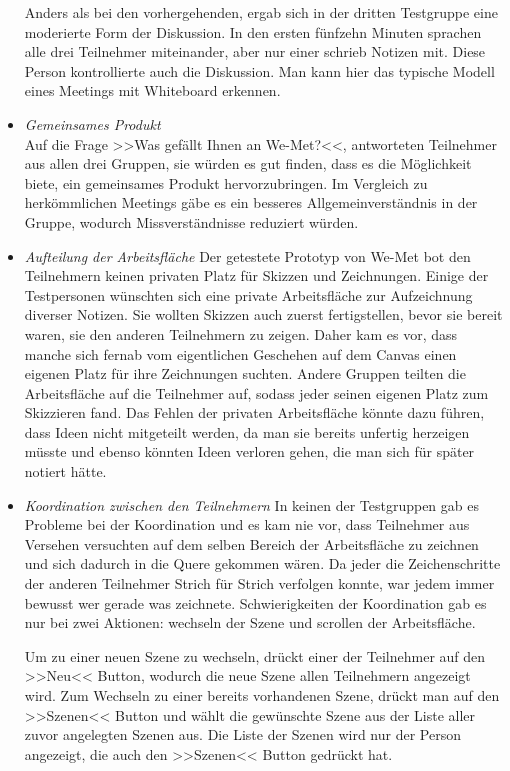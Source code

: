 \begin{itemize}
	Anders als bei den vorhergehenden, ergab sich in der dritten Testgruppe eine moderierte Form der Diskussion. In den ersten fünfzehn Minuten sprachen alle drei Teilnehmer miteinander, aber nur einer schrieb Notizen mit. Diese Person kontrollierte auch die Diskussion. Man kann hier das typische Modell eines Meetings mit Whiteboard erkennen.
	
	\item\textit{Gemeinsames Produkt}\\
	Auf die Frage >>Was gefällt Ihnen an We-Met?<<, antworteten Teilnehmer aus allen drei Gruppen, sie würden es gut finden, dass es die Möglichkeit biete, ein gemeinsames Produkt hervorzubringen. Im Vergleich zu herkömmlichen Meetings gäbe es ein besseres Allgemeinverständnis in der Gruppe, wodurch Missverständnisse reduziert würden.
	
	\item\textit{Aufteilung der Arbeitsfläche}
	Der getestete Prototyp von We-Met bot den Teilnehmern keinen privaten Platz für Skizzen und Zeichnungen. Einige der Testpersonen wünschten sich eine private Arbeitsfläche zur Aufzeichnung diverser Notizen. Sie wollten Skizzen auch zuerst fertigstellen, bevor sie bereit waren, sie den anderen Teilnehmern zu zeigen. Daher kam es vor, dass manche sich fernab vom eigentlichen Geschehen auf dem Canvas einen eigenen Platz für ihre Zeichnungen suchten. Andere Gruppen teilten die Arbeitsfläche auf die Teilnehmer auf, sodass jeder seinen eigenen Platz zum Skizzieren fand. Das Fehlen der privaten Arbeitsfläche könnte dazu führen, dass Ideen nicht mitgeteilt werden, da man sie bereits unfertig herzeigen müsste und ebenso könnten Ideen verloren gehen, die man sich für später notiert hätte.
	
	\item\textit{Koordination zwischen den Teilnehmern}
	In keinen der Testgruppen gab es Probleme bei der Koordination und es kam nie vor, dass Teilnehmer aus Versehen versuchten auf dem selben Bereich der Arbeitsfläche zu zeichnen und sich dadurch in die Quere gekommen wären. Da jeder die Zeichenschritte der anderen Teilnehmer Strich für Strich verfolgen konnte, war jedem immer bewusst wer gerade was zeichnete. Schwierigkeiten der Koordination gab es nur bei zwei Aktionen: wechseln der Szene und scrollen der Arbeitsfläche.
	
	Um zu einer neuen Szene zu wechseln, drückt einer der Teilnehmer auf den >>Neu<< Button, wodurch die neue Szene allen Teilnehmern angezeigt wird. Zum Wechseln zu einer bereits vorhandenen Szene, drückt man auf den >>Szenen<< Button und wählt die gewünschte Szene aus der Liste aller zuvor angelegten Szenen aus. Die Liste der Szenen wird nur der Person angezeigt, die auch den >>Szenen<< Button gedrückt hat.
	

\end{itemize}
